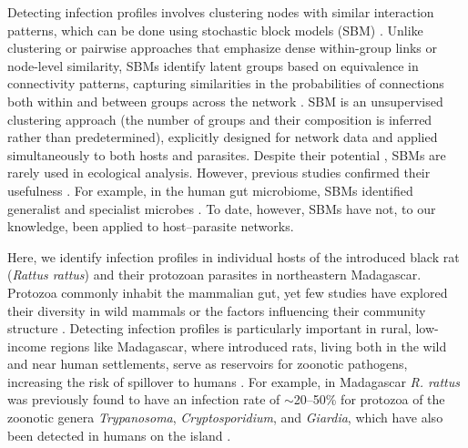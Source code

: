 \documentclass[oneside, a4paper, onecolumn, 11pt]{article}
\begin{document}
Detecting infection profiles involves clustering nodes with similar interaction patterns, which can be done using stochastic block models (SBM) \citep{Rosvall2018-jg}. Unlike clustering or pairwise approaches that emphasize dense within-group links or node-level similarity, SBMs identify latent groups based on equivalence in connectivity patterns, capturing similarities in the probabilities of connections both within and between groups across the network \citep{Rosvall2018-jg, Allesina2009-ra}. SBM is an unsupervised clustering approach (the number of groups and their composition is inferred rather than predetermined), explicitly designed for network data and applied simultaneously to both hosts and parasites. Despite their potential \citep{Leger2015-xn}, SBMs are rarely used in ecological analysis. However, previous studies confirmed their usefulness \citep{Baskerville2011-pb, Cobo-Lopez2022-rt, Galai2024-en, Miele2020-ba}. For example, in the human gut microbiome, SBMs identified generalist and specialist microbes \citep{Cobo-Lopez2022-rt}. To date, however, SBMs have not, to our knowledge, been applied to host–parasite networks.

Here, we identify infection profiles in individual hosts of the introduced black rat (\textit{Rattus rattus}) and their protozoan parasites in northeastern Madagascar. Protozoa commonly inhabit the mammalian gut, yet few studies have explored their diversity in wild mammals or the factors influencing their community structure \citep{Hunter-Barnett2024-pe}. Detecting infection profiles is particularly important in rural, low-income regions like Madagascar, where introduced rats, living both in the wild and near human settlements, serve as reservoirs for zoonotic pathogens, increasing the risk of spillover to humans \citep{Rahelinirina2010-li,Spencer2020-gm}. For example, in Madagascar \textit{R. rattus} was previously found to have an infection rate of $\sim$20–50\% for protozoa of the zoonotic genera \textit{Trypanosoma}, \textit{Cryptosporidium}, and \textit{Giardia}, which have also been detected in humans on the island \citep{Rasoanoro2019-vo,Spencer2020-gm}.
\end{document}
